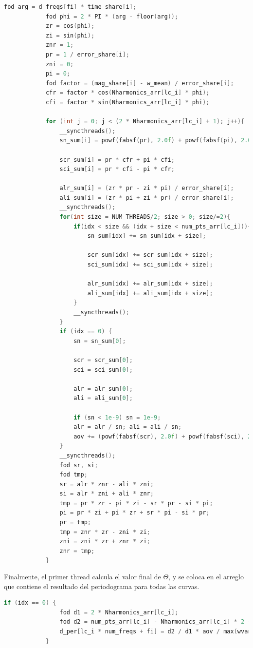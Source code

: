 \begin{lstlisting}[language=C++]
        fod arg = d_freqs[fi] * time_share[i];
            fod phi = 2 * PI * (arg - floor(arg));
            zr = cos(phi);
            zi = sin(phi);
            znr = 1;
            pr = 1 / error_share[i];
            zni = 0;
            pi = 0;
            fod factor = (mag_share[i] - w_mean) / error_share[i];
            cfr = factor * cos(Nharmonics_arr[lc_i] * phi);
            cfi = factor * sin(Nharmonics_arr[lc_i] * phi);

            for (int j = 0; j < (2 * Nharmonics_arr[lc_i] + 1); j++){
                __syncthreads();
                sn_sum[i] = powf(fabsf(pr), 2.0f) + powf(fabsf(pi), 2.0f);

                scr_sum[i] = pr * cfr + pi * cfi;
                sci_sum[i] = pr * cfi - pi * cfr;

                alr_sum[i] = (zr * pr - zi * pi) / error_share[i];
                ali_sum[i] = (zr * pi + zi * pr) / error_share[i];
                __syncthreads();
                for(int size = NUM_THREADS/2; size > 0; size/=2){
                    if(idx < size && (idx + size < num_pts_arr[lc_i])){
                        sn_sum[idx] += sn_sum[idx + size];

                        scr_sum[idx] += scr_sum[idx + size];
                        sci_sum[idx] += sci_sum[idx + size];

                        alr_sum[idx] += alr_sum[idx + size];
                        ali_sum[idx] += ali_sum[idx + size];
                    }
                    __syncthreads();
                }
                if (idx == 0) {
                    sn = sn_sum[0];

                    scr = scr_sum[0];
                    sci = sci_sum[0];

                    alr = alr_sum[0];
                    ali = ali_sum[0];

                    if (sn < 1e-9) sn = 1e-9;
                    alr = alr / sn; ali = ali / sn;
                    aov += (powf(fabsf(scr), 2.0f) + powf(fabsf(sci), 2.0f))/sn;
                }
                __syncthreads();
                fod sr, si;
                fod tmp;
                sr = alr * znr - ali * zni;
                si = alr * zni + ali * znr;
                tmp = pr * zr - pi * zi - sr * pr - si * pi;
                pi = pr * zi + pi * zr + sr * pi - si * pr;
                pr = tmp;
                tmp = znr * zr - zni * zi;
                zni = zni * zr + znr * zi;
                znr = tmp;
            }
\end{lstlisting}
Finalmente, el primer thread calcula el valor final de $\Theta$, y se coloca en el arreglo que contiene el resultado del periodograma para todas las curvas.
\begin{lstlisting}[language=C++]
            if (idx == 0) {
                fod d1 = 2 * Nharmonics_arr[lc_i];
                fod d2 = num_pts_arr[lc_i] - Nharmonics_arr[lc_i] * 2 - 1;
                d_per[lc_i * num_freqs + fi] = d2 / d1 * aov / max(wvar - aov, 1e-9);
            }
\end{lstlisting}

